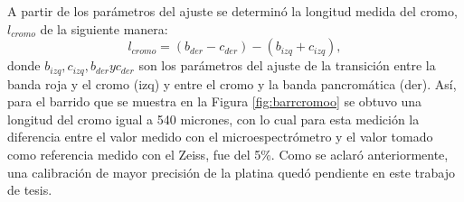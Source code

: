 \begin{figure}[H]
	\begin{floatrow}
	\end{floatrow}
\end{figure}

A partir de los parámetros del ajuste se determinó la longitud medida del cromo, $l_{cromo}$ de la siguiente manera:
\begin{equation}
l_{cromo} = (b_{der} - c_{der}) - (b_{izq} + c_{izq}),
\end{equation}
donde $b_{izq}, c_{izq}, b_{der} yc_{der}$ son los parámetros del ajuste de la transición entre la banda roja y el cromo (izq) y entre el cromo y la banda pancromática (der). Así, para el barrido que se muestra en la Figura \ref{fig:barrcromoo} se obtuvo una longitud del cromo igual a 540 micrones, con lo cual para esta medición la diferencia entre el valor medido con el microespectrómetro y el valor tomado como referencia medido con el Zeiss, fue del 5\%. Como se aclaró anteriormente, una calibración de mayor precisión de la platina quedó pendiente en este trabajo de tesis. %

